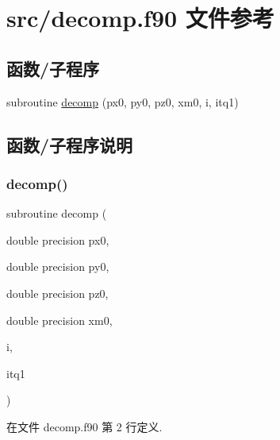 \hypertarget{decomp_8f90}{}\section{src/decomp.f90 文件参考}
\label{decomp_8f90}
\subsection*{函数/子程序}
\begin{DoxyCompactItemize}
\item 
subroutine \mbox{\hyperlink{decomp_8f90_a21efea88b92ed6ac3d10356bbcae0c11}{decomp}} (px0, py0, pz0, xm0, i, itq1)
\end{DoxyCompactItemize}


\subsection{函数/子程序说明}
\mbox{\label{decomp_8f90_a21efea88b92ed6ac3d10356bbcae0c11}} 
\subsubsection{\texorpdfstring{decomp()}{decomp()}}
{\footnotesize\ttfamily subroutine decomp (\begin{DoxyParamCaption}\item[{double precision}]{px0,  }\item[{double precision}]{py0,  }\item[{double precision}]{pz0,  }\item[{double precision}]{xm0,  }\item[{}]{i,  }\item[{}]{itq1 }\end{DoxyParamCaption})}



在文件 decomp.\+f90 第 2 行定义.

